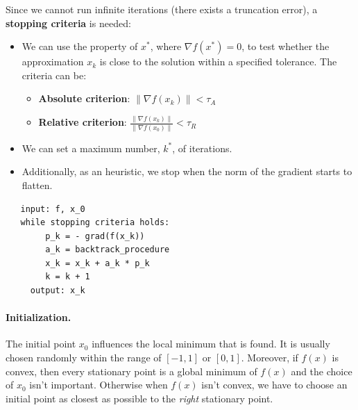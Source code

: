\documentclass{article}
\begin{document}
Since we cannot run infinite iterations (there exists a truncation error), a
\textbf{stopping criteria} is needed:
\begin{itemize}
    \item We can use the property of $x^*$, where $\nabla f(x^*)=0$, to test
        whether the approximation $x_k$ is close to the solution within a
        specified tolerance. The criteria can be:
        \begin{itemize}
            \item \textbf{Absolute criterion}: $\lVert \nabla
                f(x_k)\rVert<\tau_A$
            \item \textbf{Relative criterion}: $\frac{\lVert \nabla
                f(x_k)\rVert}{\lVert \nabla f(x_0)\rVert}<\tau_R$
        \end{itemize}
    \item We can set a maximum number, $k^*$, of iterations.
    \item Additionally, as an heuristic, we stop when the norm of the gradient
        starts to flatten.
\end{itemize}
\begin{verbatim}
   input: f, x_0
   while stopping criteria holds:
        p_k = - grad(f(x_k))
        a_k = backtrack_procedure
        x_k = x_k + a_k * p_k
        k = k + 1
     output: x_k
\end{verbatim}
\paragraph{Initialization.} The initial point $x_0$ influences the
local minimum that is found. It is usually chosen randomly within the range of
$[-1,1]$ or $[0,1]$. Moreover, if $f(x)$ is convex, then every stationary
point is a global minimum of $f(x)$ and the choice of $x_0$ isn't important.
Otherwise when $f(x)$ isn't convex, we have to choose an initial point as
closest as possible to the \textit{right} stationary point.

\mbox{}
\end{document}
